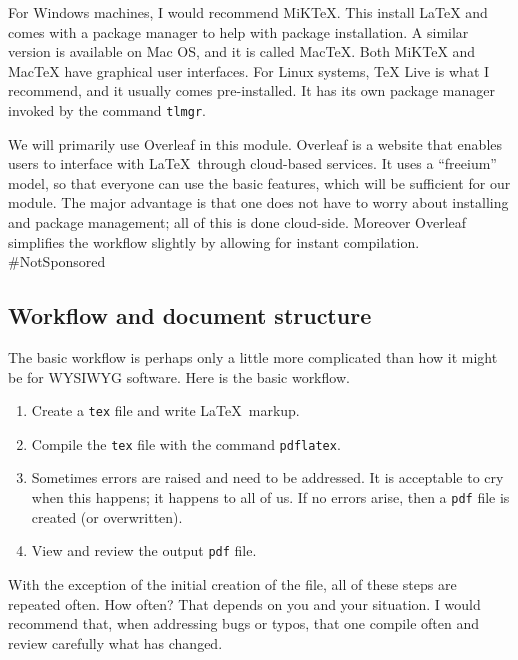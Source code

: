\documentclass[a4paper, 12pt]{article}
\numberwithin{equation}{section}
\numberwithin{figure}{section}
\theoremstyle{definition}
\begin{document}
For Windows machines, I would recommend MiKTeX. This install LaTeX and comes
with a package manager to help with package installation. A similar version is
available on Mac OS, and it is called MacTeX. Both MiKTeX and MacTeX have
graphical user interfaces. For Linux systems, TeX Live is what I recommend, and
it usually comes pre-installed. It has its own package manager invoked by the
command \texttt{tlmgr}. 

We will primarily use Overleaf in this module. Overleaf is a website that
enables users to interface with \LaTeX\ through cloud-based services. It uses a
``freeium'' model, so that everyone can use the basic features, which will be
sufficient for our module. The major advantage is that one does not have to
worry about installing and package management; all of this is done cloud-side.
Moreover Overleaf simplifies the workflow slightly by allowing for instant
compilation. \#NotSponsored 

\subsection{Workflow and document structure}
\label{sec:workflow}

The basic workflow is perhaps only a little more complicated than how it might
be for WYSIWYG software. Here is the basic workflow. 
\begin{enumerate}
	\item Create a \texttt{tex} file and write \LaTeX\ markup. 
	\item Compile the \texttt{tex} file with the command \texttt{pdflatex}.
	\item Sometimes errors are raised and need to be addressed. It is acceptable
	to cry when this happens; it happens to all of us. If no errors arise, then
	a \texttt{pdf} file is created (or overwritten). 
	\item View and review the output \texttt{pdf} file. 
\end{enumerate}
With the exception of the initial creation of the file, all of these steps are
repeated often. How often? That depends on you and your situation. I would
recommend that, when addressing bugs or typos, that one compile often and review
carefully what has changed. 
\end{document}
